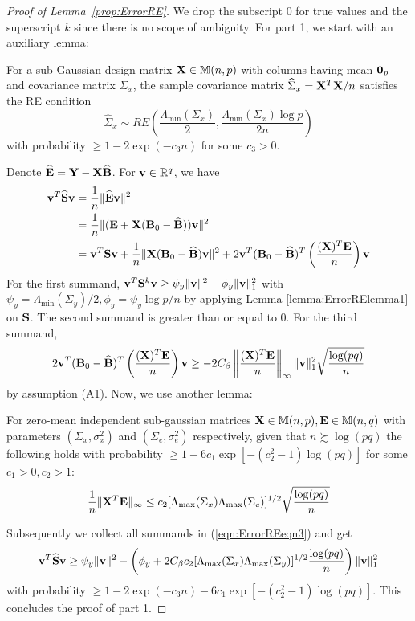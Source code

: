 \begin{proof}[Proof of Lemma~\ref{prop:ErrorRE}]
We drop the subscript 0 for true values and the superscript $k$ since there is no scope of ambiguity. For part 1, we start with an auxiliary lemma:
%
\begin{Lemma}\label{lemma:ErrorRElemma1}
For a sub-Gaussian design matrix ${\mathbf{X}} \in {\mathbb{M}}(n,p)$ with columns having mean ${\bf 0}_p$ and covariance matrix $\Sigma_x$, the sample covariance matrix $\widehat \Sigma_x = {\mathbf{X}}^T {\mathbf{X}}/n$ satisfies the RE condition
%
$$
\widehat \Sigma_x \sim RE \left( \frac{\Lambda_{\min} ( \Sigma_x) }{2}, \frac{\Lambda_{\min} ( \Sigma_x) \log p }{2 n} \right)
$$
%
with probability $\geq 1 - 2 \exp(-c_3 n)$ for some $c_3 > 0$.
\end{Lemma}
%
Denote $\widehat {{\mathbf{E}}} = {\mathbf{Y}} - {\mathbf{X}} \widehat {{\mathbf{B}}}$. For ${\bf{v}} \in {\mathbb{R}}^q$, we have
%
\begin{align}\label{eqn:ErrorREeqn3}
{\bf{v}}^T \widehat {{\mathbf{S}}} {\bf{v}} &= \frac{1}{n} \| \widehat {{\mathbf{E}}} {\bf{v}} \|^2 \notag\\
&= \frac{1}{n} \| ({\mathbf{E}} + {\mathbf{X}} ( {\mathbf{B}}_0 - \widehat {{\mathbf{B}}} )){\bf{v}} \|^2 \notag\\
&= {\bf{v}}^T {\mathbf{S}} {\bf{v}} + \frac{1}{n} \| {\mathbf{X}} ({\mathbf{B}}_0 - \widehat {{\mathbf{B}}}) {\bf{v}} \|^2 + 2 {\bf{v}}^T ({\mathbf{B}}_0 - \widehat {{\mathbf{B}}})^T \left( \frac {({\mathbf{X}})^T {\mathbf{E}}}{n} \right) {\bf{v}}
\end{align}
%
For the first summand, $ {\bf{v}}^T {\mathbf{S}}^k {\bf{v}} \geq \psi_y \| {\bf{v}} \|^2 - \phi_y \| {\bf{v}} \|_1^2$ with $\psi_y = \Lambda_{\min} (\Sigma_y)/2, \phi_y = \psi_y \log p/n$ by applying Lemma \ref{lemma:ErrorRElemma1} on ${\mathbf{S}}$. The second summand is greater than or equal to 0. For the third summand,
%
$$
2 {\bf{v}}^T ({\mathbf{B}}_0 - \widehat {{\mathbf{B}}})^T \left( \frac {({\mathbf{X}})^T {\mathbf{E}}}{n} \right) {\bf{v}} \geq
-2 C_\beta \left\| \frac {({\mathbf{X}})^T {\mathbf{E}}}{n} \right\|_\infty \| {\bf{v}} \|_1^2
\sqrt{ \frac{ \log (pq)}{n}}
$$
%
by assumption (A1). Now, we use another lemma:
%
\begin{Lemma}\label{lemma:ErrorRElemma2}
For zero-mean independent sub-gaussian matrices ${\mathbf{X}} \in {\mathbb{M}}(n,p), {\mathbf{E}} \in {\mathbb{M}}(n,q)$ with parameters $(\Sigma_x, \sigma_x^2)$ and $(\Sigma_e, \sigma_e^2)$ respectively, given that $n \succsim \log(pq)$ the following holds with probability $\geq 1 - 6c_1 \exp [-(c_2^2-1) \log(pq)]$ for some $c_1 >0, c_2 > 1$:
%
$$
\frac{1}{n} \| {\mathbf{X}}^T {\mathbf{E}} \|_\infty \leq c_2 [ \Lambda_{\max} (\Sigma_x) \Lambda_{\max} (\Sigma_e) ]^{1/2} \sqrt{\frac{ \log(pq)}{n}}
$$
%
\end{Lemma}
%
Subsequently we collect all summands in (\ref{eqn:ErrorREeqn3}) and get
%
$$
{\bf{v}}^T \widehat{ {\mathbf{S}}} {\bf{v}} \geq \psi_y \| {\bf{v}} \|^2 - \left( \phi_y + 2 C_\beta c_2 [ \Lambda_{\max} (\Sigma_x) \Lambda_{\max} (\Sigma_y) ]^{1/2} \frac{ \log(pq)}{n} \right) \| {\bf{v}} \|_1^2
$$
with probability $\geq 1 - 2\exp(- c_3 n) - 6c_1 \exp [-(c_2^2-1) \log(pq)]$. This concludes the proof of part 1.


\end{proof}
